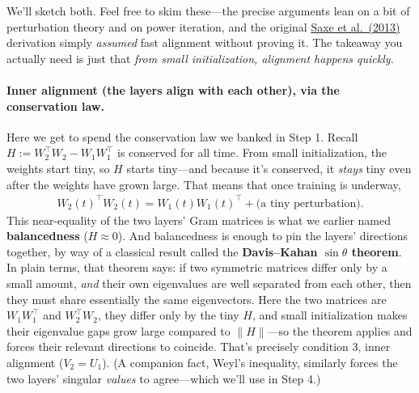 We'll sketch both. Feel free to skim these---the precise arguments lean on a bit
of perturbation theory and on power iteration, and the original
\href{https://arxiv.org/pdf/1312.6120}{Saxe et al.\ (2013)} derivation simply
\emph{assumed} fast alignment without proving it. The takeaway you actually need
is just that \emph{from small initialization, alignment happens quickly.}

\paragraph{Inner alignment (the layers align with each other), via the
conservation law.} Here we get to spend the conservation law we banked in Step 1.
Recall $H := W_2^\top W_2 - W_1 W_1^\top$ is conserved for all time. From small
initialization, the weights start tiny, so $H$ starts tiny---and because it's
conserved, it \emph{stays} tiny even after the weights have grown large. That
means that once training is underway,
\begin{align*}
    W_2(t)^\top W_2(t) = W_1(t) W_1(t)^\top + \text{(a tiny perturbation)}.
\end{align*}
This near-equality of the two layers' Gram matrices is what we earlier named
\textbf{balancedness} ($H \approx 0$). And balancedness is enough to pin the
layers' directions together, by way of a classical result called the
\textbf{Davis--Kahan $\sin\theta$ theorem}. In plain terms, that theorem says: if
two symmetric matrices differ only by a small amount, \emph{and} their own
eigenvalues are well separated from each other, then they must share essentially
the same eigenvectors. Here the two matrices are $W_1 W_1^\top$ and $W_2^\top W_2$,
they differ only by the tiny $H$, and small initialization makes their eigenvalue
gaps grow large compared to $\|H\|$---so the theorem applies and forces their
relevant directions to coincide. That's precisely condition 3, inner alignment
($V_2 = U_1$). (A companion fact, Weyl's inequality, similarly forces the two
layers' singular \emph{values} to agree---which we'll use in Step 4.)

